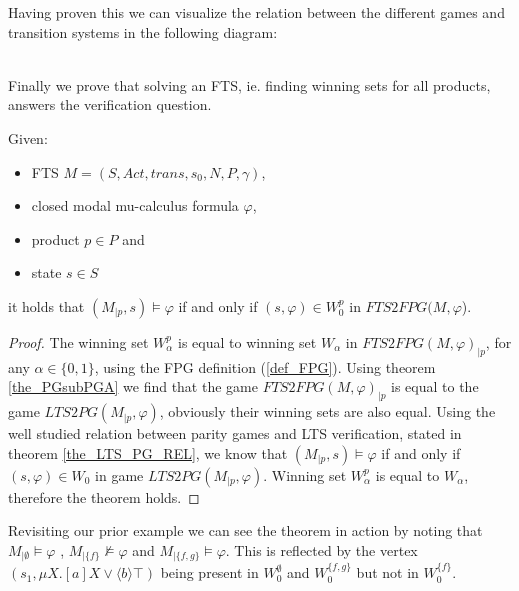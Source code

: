 Having proven this we can visualize the relation between the different games and transition systems in the following diagram:
\\\\
Finally we prove that solving an FTS, ie. finding winning sets for all products, answers the verification question.
\begin{theorem}
	\label{the_FPG_ver_FTS}
	Given:
	\begin{itemize}
		\item FTS $M = (S, Act, trans, s_0, N, P, \gamma)$,
		\item closed modal mu-calculus formula $\varphi$,
		\item product $p \in P$ and
		\item state $s \in S$
	\end{itemize}
	it holds that $(M_{|p}, s) \models \varphi$ if and only if $(s, \varphi) \in W_0^p$ in $\textit{FTS2FPG}(M, \varphi$).
	\begin{proof}
		The winning set $W_\alpha^p$ is equal to winning set $W_\alpha$ in $\textit{FTS2FPG}(M, \varphi)_{|p}$, for any $\alpha \in \{0,1\}$, using the FPG definition (\ref{def_FPG}). Using theorem \ref{the_PGsubPGA} we find that the game $FTS2FPG(M, \varphi)_{|p}$ is equal to the game $LTS2PG(M_{|p}, \varphi)$, obviously their winning sets are also equal. Using the well studied relation between parity games and LTS verification, stated in theorem \ref{the_LTS_PG_REL}, we know that $(M_{|p}, s) \models \varphi$ if and only if $(s, \varphi) \in W_0$ in game $LTS2PG(M_{|p},\varphi)$. Winning set $W_\alpha^p$ is equal to $W_\alpha$, therefore the theorem holds.
	\end{proof}
\end{theorem}

Revisiting our prior example we can see the theorem in action by noting that $M_{|\emptyset} \models \varphi$ , $M_{|\{f\}} \not\models \varphi$ and $M_{|\{f,g\}} \models \varphi$. This is reflected by the vertex $(s_1, \mu X. [a]X \vee \langle b \rangle \top)$ being present in $W_0^\emptyset$ and $W_0^{\{f,g\}}$ but not in $W_0^{\{f\}}$.

